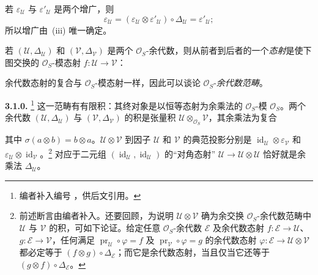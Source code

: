 若 \(\varepsilon_{\mathcal U}\) 与 \(\varepsilon'_{\mathcal U}\) 是两个增广，则
\[
  \varepsilon_{\mathcal U}
  =(\varepsilon_{\mathcal U}\otimes\varepsilon'_{\mathcal U})
    \circ\Delta_{\mathcal U}
  =\varepsilon'_{\mathcal U};
\]
所以增广由~(iii) 唯一确定。

若 \((\mathcal U,\Delta_{\mathcal U})\) 和 \((\mathcal V,\Delta_{\mathcal V})\) 是两个 \(\mathcal O_S\)-余代数，则从前者到后者的一个\emph{态射}是使下图交换的 \(\mathcal O_S\)-模态射 \(f:\mathcal U\to\mathcal V\)：
\begin{center}
  \label{sga3:VIIA:3.1-coalgebra-morphism-diagrams}
  
\end{center}
余代数态射的复合与 \(\mathcal O_S\)-模态射一样，因此可以谈论 \(\mathcal O_S\)-\emph{余代数范畴}。

\medskip
\noindent\textbf{3.1.0.}
\label{sga3:VIIA:3.1.0}
\footnote{编者补入编号 ，供后文引用。}
这一范畴有有限积：其终对象是以恒等态射为余乘法的 \(\mathcal O_S\)-模 \(\mathcal O_S\)。两个余代数 \((\mathcal U,\Delta_{\mathcal U})\) 与 \((\mathcal V,\Delta_{\mathcal V})\) 的积是张量积 \(\mathcal U\otimes_{\mathcal O_S}\mathcal V\)，其余乘法为复合
\begin{center}
  \label{sga3:VIIA:3.1.0-product-comultiplication}
  
\end{center}
其中 \(\sigma(a\otimes b)=b\otimes a\)。\(\mathcal U\otimes\mathcal V\) 到因子 \(\mathcal U\) 和 \(\mathcal V\) 的典范投影分别是 \(\operatorname{id}_{\mathcal U}\otimes\varepsilon_{\mathcal V}\) 和 \(\varepsilon_{\mathcal U}\otimes\operatorname{id}_{\mathcal V}\)。\footnote{前述断言由编者补入。还要回顾，为说明 \(\mathcal U\otimes\mathcal V\) 确为余交换 \(\mathcal O_S\)-余代数范畴中 \(\mathcal U\) 与 \(\mathcal V\) 的积，可如下论证。给定任意 \(\mathcal O_S\)-余代数 \(\mathcal E\) 及余代数态射 \(f:\mathcal E\to\mathcal U\)、\(g:\mathcal E\to\mathcal V\)，任何满足 \(\operatorname{pr}_{\mathcal U}\circ\varphi=f\) 及 \(\operatorname{pr}_{\mathcal V}\circ\varphi=g\) 的余代数态射 \(\varphi:\mathcal E\to\mathcal U\otimes\mathcal V\) 都必定等于 \((f\otimes g)\circ\Delta_{\mathcal E}\)；而它是余代数态射，当且仅当它还等于 \((g\otimes f)\circ\Delta_{\mathcal E}\)。}
对应于二元组 \((\operatorname{id}_{\mathcal U},
  \operatorname{id}_{\mathcal U})\) 的“对角态射” \(\mathcal U\to\mathcal U\otimes\mathcal U\) 恰好就是余乘法 \(\Delta_{\mathcal U}\)。

